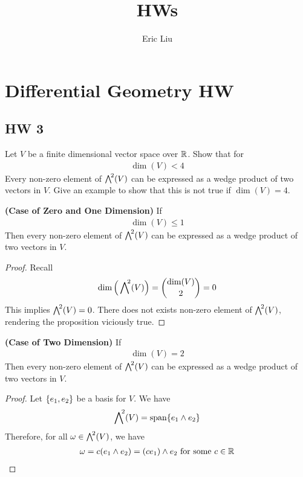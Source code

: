\documentclass{report}
\title{\Huge{HWs}}
\author{\huge{Eric Liu}}
\date{}
\begin{document}
\maketitle
\newpage%
\pagebreak
\chapter{Differential Geometry HW} 
\section{HW 3}
\begin{question}{}{}
Let $V$ be a finite dimensional vector space over $\mathbb{R}$. Show that for 
 \begin{align*}
\operatorname{dim}(V)<4
\end{align*}
Every non-zero element of $\extp^2(V)$ can be expressed as a wedge product of two vectors in $V$.  Give an example to show that this is not true if $\operatorname{dim}(V)=4$. 
\end{question}
\begin{theorem}
\textbf{(Case of Zero and One Dimension)} If 
\begin{align*}
\operatorname{dim}(V)\leq 1
\end{align*}
Then every non-zero element of $\extp^2(V)$ can be expressed as a wedge product of two vectors in $V$. 
\end{theorem}
\begin{proof}
Recall
\begin{align*}
\operatorname{dim}\Big( \extp^2(V) \Big)= \binom{\operatorname{dim}(V)}{2}=0
\end{align*}
This implies $\extp^2(V)=0$. There does not exists non-zero element of $\extp^2(V)$, rendering the proposition viciously true. 
\end{proof}
\begin{theorem}
\textbf{(Case of Two Dimension)} If 
\begin{align*}
\operatorname{dim}(V)=2
\end{align*}
Then every non-zero element of $\extp^2(V)$ can be expressed as a wedge product of two vectors in $V$. 
\end{theorem}
\begin{proof}
Let  $\{ e_1,e_2 \}$ be a basis for $V$.  We have 
\begin{align*}
\extp^2(V)=\operatorname{span} \set{e_1 \wedge  e_2}
\end{align*}
Therefore, for all $\omega \in \extp^2(V)$, we have 
\begin{align*}
\omega  = c(e_1 \wedge  e_2)=(ce_1) \wedge  e_2 \text{ for some }c\in\mathbb{R}  
\end{align*}
\end{proof}
\end{document}
